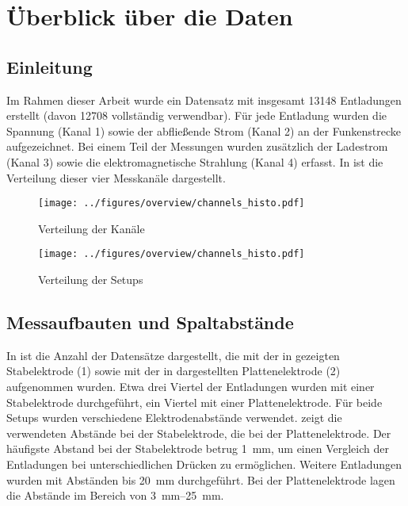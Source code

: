 \chapter{Überblick über die Daten}
\label{chap:overview}

\section{Einleitung}
\label{sec:overview}
Im Rahmen dieser Arbeit wurde ein Datensatz mit insgesamt 13148 Entladungen erstellt (davon 12708 vollständig verwendbar). Für jede Entladung wurden die Spannung (Kanal 1) sowie der abfließende Strom (Kanal 2) an der Funkenstrecke aufgezeichnet. Bei einem Teil der Messungen wurden zusätzlich der Ladestrom (Kanal 3) sowie die elektromagnetische Strahlung (Kanal 4) erfasst. In  ist die Verteilung dieser vier Messkanäle dargestellt.

\begin{figure}[htbp]
    \centering
    \begin{minipage}[t]{0.47\textwidth}
      \centering
      \texttt{[image: ../figures/overview/channels\_histo.pdf]}
      \caption{Verteilung der Kanäle}
      \label{fig:histogram-channels}
   \end{minipage}
 \begin{minipage}[t]{0.47\textwidth}
      \centering
      \texttt{[image: ../figures/overview/channels\_histo.pdf]}
      \caption{Verteilung der Setups}
      \label{fig:histogram-setup}
  \end{minipage}
\end{figure}


\section{Messaufbauten und Spaltabstände}

In  ist die Anzahl der Datensätze dargestellt, die mit der in  gezeigten Stabelektrode (1) sowie mit der in  dargestellten Plattenelektrode (2) aufgenommen wurden. Etwa drei Viertel der Entladungen wurden mit einer Stabelektrode durchgeführt, ein Viertel mit einer Plattenelektrode. 
Für beide Setups wurden verschiedene Elektrodenabstände verwendet.  zeigt die verwendeten Abstände bei der Stabelektrode,  die bei der Plattenelektrode. Der häufigste Abstand bei der Stabelektrode betrug \SI{1}{\milli\metre}, um einen Vergleich der Entladungen bei unterschiedlichen Drücken zu ermöglichen. Weitere Entladungen wurden mit Abständen bis \SI{20}{\milli\metre} durchgeführt. Bei der Plattenelektrode lagen die Abstände im Bereich von \SIrange{3}{25}{\milli\metre}. 

